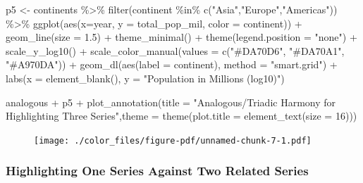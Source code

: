 \documentclass[
  letterpaper,
]{book}
\newenvironment{Shaded}{\begin{snugshade}}{\end{snugshade}}
\newcommand{\AttributeTok}[1]{\textcolor[rgb]{0.40,0.45,0.13}{#1}}
\newcommand{\DecValTok}[1]{\textcolor[rgb]{0.68,0.00,0.00}{#1}}
\newcommand{\FloatTok}[1]{\textcolor[rgb]{0.68,0.00,0.00}{#1}}
\newcommand{\FunctionTok}[1]{\textcolor[rgb]{0.28,0.35,0.67}{#1}}
\newcommand{\NormalTok}[1]{\textcolor[rgb]{0.00,0.23,0.31}{#1}}
\newcommand{\OtherTok}[1]{\textcolor[rgb]{0.00,0.23,0.31}{#1}}
\newcommand{\SpecialCharTok}[1]{\textcolor[rgb]{0.37,0.37,0.37}{#1}}
\newcommand{\StringTok}[1]{\textcolor[rgb]{0.13,0.47,0.30}{#1}}
\begin{document}
\begin{Shaded}
\begin{Highlighting}[]
\NormalTok{p5 }\OtherTok{\textless{}{-}}\NormalTok{ continents }\SpecialCharTok{\%\textgreater{}\%} 
  \FunctionTok{filter}\NormalTok{(continent }\SpecialCharTok{\%in\%} \FunctionTok{c}\NormalTok{(}\StringTok{"Asia"}\NormalTok{,}\StringTok{"Europe"}\NormalTok{,}\StringTok{"Americas"}\NormalTok{)) }\SpecialCharTok{\%\textgreater{}\%} 
  \FunctionTok{ggplot}\NormalTok{(}\FunctionTok{aes}\NormalTok{(}\AttributeTok{x=}\NormalTok{year, }\AttributeTok{y =}\NormalTok{ total\_pop\_mil, }\AttributeTok{color =}\NormalTok{ continent)) }\SpecialCharTok{+} 
  \FunctionTok{geom\_line}\NormalTok{(}\AttributeTok{size =} \FloatTok{1.5}\NormalTok{) }\SpecialCharTok{+} 
  \FunctionTok{theme\_minimal}\NormalTok{() }\SpecialCharTok{+} 
  \FunctionTok{theme}\NormalTok{(}\AttributeTok{legend.position =} \StringTok{"none"}\NormalTok{) }\SpecialCharTok{+}
  \FunctionTok{scale\_y\_log10}\NormalTok{() }\SpecialCharTok{+}
  \FunctionTok{scale\_color\_manual}\NormalTok{(}\AttributeTok{values =} \FunctionTok{c}\NormalTok{(}\StringTok{"\#DA70D6"}\NormalTok{, }\StringTok{"\#DA70A1"}\NormalTok{, }\StringTok{"\#A970DA"}\NormalTok{))  }\SpecialCharTok{+}
  \FunctionTok{geom\_dl}\NormalTok{(}\FunctionTok{aes}\NormalTok{(}\AttributeTok{label =}\NormalTok{ continent), }\AttributeTok{method =} \StringTok{"smart.grid"}\NormalTok{) }\SpecialCharTok{+}
  \FunctionTok{labs}\NormalTok{(}\AttributeTok{x =} \FunctionTok{element\_blank}\NormalTok{(), }\AttributeTok{y =} \StringTok{"Population in Millions (log10)"}\NormalTok{)}

\NormalTok{analogous }\SpecialCharTok{+}\NormalTok{ p5 }\SpecialCharTok{+} \FunctionTok{plot\_annotation}\NormalTok{(}\AttributeTok{title =} \StringTok{"Analogous/Triadic Harmony for Highlighting Three Series"}\NormalTok{,}\AttributeTok{theme =} \FunctionTok{theme}\NormalTok{(}\AttributeTok{plot.title =} \FunctionTok{element\_text}\NormalTok{(}\AttributeTok{size =} \DecValTok{16}\NormalTok{)))}
\end{Highlighting}
\end{Shaded}

\begin{figure}[H]

{\centering \texttt{[image: ./color\_files/figure-pdf/unnamed-chunk-7-1.pdf]}

}

\end{figure}

\hypertarget{highlighting-one-series-against-two-related-series}{%
\subsubsection{Highlighting One Series Against Two Related
Series}\label{highlighting-one-series-against-two-related-series}}
\end{document}
